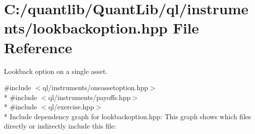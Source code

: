 \section{C\+:/quantlib/\+Quant\+Lib/ql/instruments/lookbackoption.hpp File Reference}
\label{lookbackoption_8hpp}


Lookback option on a single asset.  


{\ttfamily \#include $<$ql/instruments/oneassetoption.\+hpp$>$}\\*
{\ttfamily \#include $<$ql/instruments/payoffs.\+hpp$>$}\\*
{\ttfamily \#include $<$ql/exercise.\+hpp$>$}\\*
Include dependency graph for lookbackoption.\+hpp\+:
This graph shows which files directly or indirectly include this file\+:
